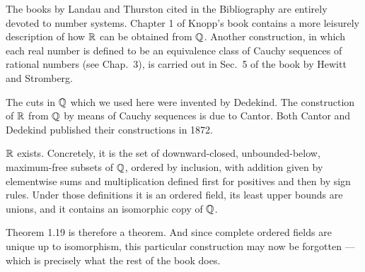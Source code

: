 The books by Landau and Thurston cited in the Bibliography are entirely devoted
to number systems. Chapter 1 of Knopp's book contains a more leisurely
description of how $\mathbb{R}$ can be obtained from $\mathbb{Q}$. Another construction, in
which each real number is defined to be an equivalence class of Cauchy sequences
of rational numbers (see Chap.\ 3), is carried out in Sec.\ 5 of the book by
Hewitt and Stromberg.

The cuts in $\mathbb{Q}$ which we used here were invented by Dedekind. The construction
of $\mathbb{R}$ from $\mathbb{Q}$ by means of Cauchy sequences is due to Cantor. Both Cantor and
Dedekind published their constructions in 1872.

\begin{recap}
$\mathbb{R}$ exists. Concretely, it is the set of downward-closed, unbounded-below,
maximum-free subsets of $\mathbb{Q}$, ordered by inclusion, with addition given by
elementwise sums and multiplication defined first for positives and then by sign
rules. Under those definitions it is an ordered field, its least upper bounds are
unions, and it contains an isomorphic copy of $\mathbb{Q}$.

\smallskip
Theorem 1.19 is therefore a theorem. And since complete ordered fields are
unique up to isomorphism, this particular construction may now be forgotten ---
which is precisely what the rest of the book does.
\end{recap}
